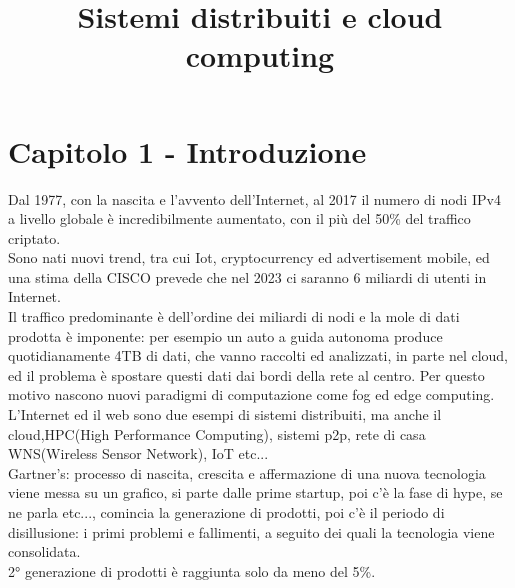 \documentclass[16px]{article}
\begin{document}
\title{Sistemi distribuiti e cloud computing}
\maketitle
\tableofcontents
\section{Capitolo 1 - Introduzione}
Dal 1977, con la nascita e l'avvento dell'Internet, al 2017 il numero di nodi IPv4 a livello globale è incredibilmente aumentato, con il più del 50\% del traffico criptato.\\
Sono nati nuovi trend, tra cui Iot, cryptocurrency ed advertisement mobile, ed una stima della CISCO prevede che nel 2023 ci saranno 6 miliardi di utenti in Internet.\\
Il traffico predominante è dell'ordine dei miliardi di nodi e la mole di dati prodotta è imponente: per esempio un auto a guida autonoma produce quotidianamente 4TB di dati, che vanno raccolti ed analizzati, in parte nel cloud, ed il problema è spostare questi dati dai bordi della rete al centro. Per questo motivo nascono nuovi paradigmi di computazione come fog ed edge computing.\\

L'Internet ed il web sono due esempi di sistemi distribuiti, ma anche il cloud,HPC(High Performance Computing), sistemi p2p, rete di casa WNS(Wireless Sensor Network), IoT etc...\\
Gartner's: processo di nascita, crescita e affermazione di una nuova tecnologia viene messa su un grafico, si parte dalle prime startup, poi c'è la fase di hype, se ne parla etc..., comincia la generazione di prodotti, poi c'è il periodo di disillusione: i primi problemi e fallimenti, a seguito dei quali la tecnologia viene consolidata.\\
2° generazione di prodotti è raggiunta solo da meno del 5\%.
\end{document}
